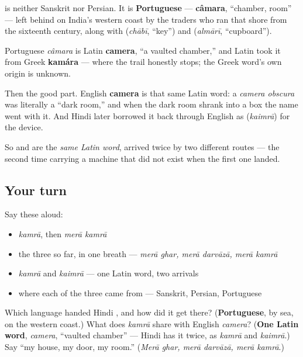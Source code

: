 \begin{cousinweb}
\textbf{} is neither Sanskrit nor Persian. It is \textbf{Portuguese} — \textbf{câmara}, \textquotedblleft{}chamber, room\textquotedblright{} — left behind on India's western coast by the traders who ran that shore from the sixteenth century, along with \textbf{} (\emph{chābī}, \textquotedblleft{}key\textquotedblright{}) and \textbf{} (\emph{almārī}, \textquotedblleft{}cupboard\textquotedblright{}).

Portuguese \emph{câmara} is Latin \textbf{camera}, \textquotedblleft{}a vaulted chamber,\textquotedblright{} and Latin took it from Greek \textbf{kamára} — where the trail honestly stops; the Greek word's own origin is unknown.

Then the good part. English \textbf{camera} is that same Latin word: a \emph{camera obscura} was literally a \textquotedblleft{}dark room,\textquotedblright{} and when the dark room shrank into a box the name went with it. And Hindi later borrowed it back through English as \textbf{} (\emph{kaimrā}) for the device.

So \textbf{} and \textbf{} are the \emph{same Latin word}, arrived twice by two different routes — the second time carrying a machine that did not exist when the first one landed.
\end{cousinweb}

\subsection*{Your turn}
Say these aloud:

\begin{itemize}
\raggedright
  \item \emph{kamrā}, then \emph{merā kamrā}
  \item the three so far, in one breath — \emph{merā ghar, merā darvāzā, merā kamrā}
  \item \emph{kamrā} and \emph{kaimrā} — one Latin word, two arrivals
  \item where each of the three came from — Sanskrit, Persian, Portuguese
\end{itemize}

\begin{tcolorbox}[breakable,colback=teal!4,colframe=teal!35!black,title={Before you move on}]
Which language handed Hindi \textbf{}, and how did it get there? (\textbf{Portuguese}, by sea, on the western coast.) What does \emph{kamrā} share with English \emph{camera}? (\textbf{One Latin word}, \emph{camera}, \textquotedblleft{}vaulted chamber\textquotedblright{} — Hindi has it twice, as \emph{kamrā} and \emph{kaimrā}.) Say \textquotedblleft{}my house, my door, my room.\textquotedblright{} (\emph{Merā ghar, merā darvāzā, merā kamrā}.)
\end{tcolorbox}
